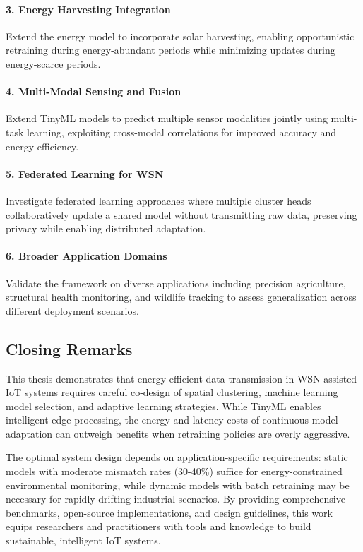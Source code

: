 \documentclass[12pt,a4paper]{article}
\newlength{\defbaselineskip}
\newcommand{\setlinespacing}[1]%
           {\setlength{\baselineskip}{#1 \defbaselineskip}}
\begin{document}
\paragraph{3. Energy Harvesting Integration}
Extend the energy model to incorporate solar harvesting, enabling opportunistic retraining during energy-abundant periods while minimizing updates during energy-scarce periods.

\paragraph{4. Multi-Modal Sensing and Fusion}
Extend TinyML models to predict multiple sensor modalities jointly using multi-task learning, exploiting cross-modal correlations for improved accuracy and energy efficiency.

\paragraph{5. Federated Learning for WSN}
Investigate federated learning approaches \cite{Zhang2024FederatedEdge} where multiple cluster heads collaboratively update a shared model without transmitting raw data, preserving privacy while enabling distributed adaptation.

\paragraph{6. Broader Application Domains}
Validate the framework on diverse applications including precision agriculture, structural health monitoring, and wildlife tracking to assess generalization across different deployment scenarios.

\subsection{Closing Remarks}

This thesis demonstrates that energy-efficient data transmission in WSN-assisted IoT systems requires careful co-design of spatial clustering, machine learning model selection, and adaptive learning strategies. While TinyML enables intelligent edge processing, the energy and latency costs of continuous model adaptation can outweigh benefits when retraining policies are overly aggressive.

The optimal system design depends on application-specific requirements: static models with moderate mismatch rates (30-40\%) suffice for energy-constrained environmental monitoring, while dynamic models with batch retraining may be necessary for rapidly drifting industrial scenarios. By providing comprehensive benchmarks, open-source implementations, and design guidelines, this work equips researchers and practitioners with tools and knowledge to build sustainable, intelligent IoT systems.


\setlinespacing{1}

\newpage

\end{document}
